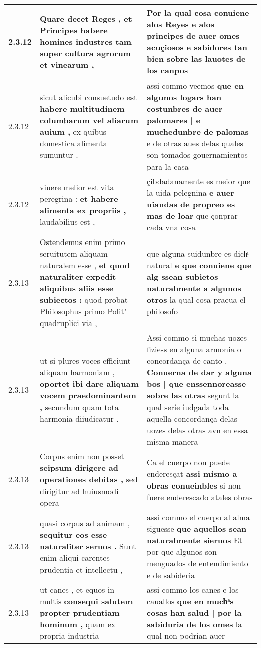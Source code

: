 \begin{tabular}{|p{1cm}|p{6.5cm}|p{6.5cm}|}
2.3.12 & Quare decet Reges , \textbf{ et Principes habere homines industres } tam super cultura agrorum et vinearum , & Por la qual cosa conuiene alos Reyes e alos principes \textbf{ de auer omes acuçiosos } e sabidores tan bien sobre las lauotes de los canpos \\\hline
2.3.12 & sicut alicubi consuetudo est \textbf{ habere multitudinem columbarum vel aliarum auium , } ex quibus domestica alimenta sumuntur . & assi commo veemos \textbf{ que en algunos logars han costunbres de auer palomares | e muchedunbre de palomas } e de otras aues delas quales son tomados gouernamientos para la casa \\\hline
2.3.12 & viuere melior est vita peregrina : \textbf{ et habere alimenta ex propriis , } laudabilius est , & çibdadanamente es meior que la uida pelegnina \textbf{ e auer uiandas de propreo es mas de loar } que çonprar cada vna cosa \\\hline
2.3.13 & Ostendemus enim primo seruitutem aliquam naturalem esse , \textbf{ et quod naturaliter expedit aliquibus aliis esse subiectos : } quod probat Philosophus primo Polit’ quadruplici via , & que alguna suidunbre es dichͣ natural \textbf{ e que conuiene que alg ssean subietos naturalmente a algunos otros } la qual cosa praeua el philosofo \\\hline
2.3.13 & ut si plures voces efficiunt aliquam harmoniam , \textbf{ oportet ibi dare aliquam vocem praedominantem , } secundum quam tota harmonia diiudicatur . & Assi commo si muchas uozes fiziess en alguna armonia o concordança de canto . \textbf{ Conuerna de dar y alguna bos | que enssennoreasse sobre las otras } segunt la qual serie iudgada toda aquella concordança delas uozes delas otras avn en essa misma manera \\\hline
2.3.13 & Corpus enim non posset \textbf{ seipsum dirigere ad operationes debitas , } sed dirigitur ad huiusmodi opera & Ca el cuerpo non puede enderesçat \textbf{ assi mismo a obras conueinbles } si non fuere enderescado atales obras \\\hline
2.3.13 & quasi corpus ad animam , \textbf{ sequitur eos esse naturaliter seruos . } Sunt enim aliqui carentes prudentia et intellectu , & assi commo el cuerpo al alma siguesse \textbf{ que aquellos sean naturalmente sieruos } Et por que algunos son menguados de entendimiento e de sabideria \\\hline
2.3.13 & ut canes , et equos in multis \textbf{ consequi salutem propter prudentiam hominum , } quam ex propria industria & assi commo los canes e los cauallos \textbf{ que en muchͣs cosas han salud | por la sabiduria de los omes } la qual non podrian auer \\\hline

\end{tabular}
